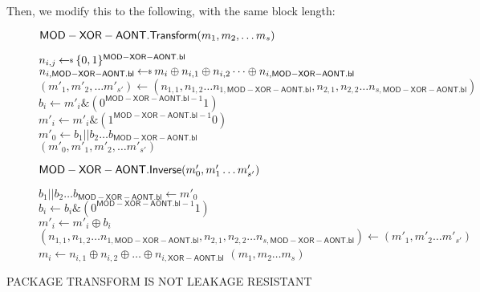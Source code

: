 \documentclass[11pt,twoside]{article}
\begin{document}
Then, we modify this to the following, with the same block length: 

\begin{figure}[h]
{
\underline{$\mathsf{MOD-XOR-AONT.Transform}(m_1,m_2,\dots m_s)$}

\begin{algorithm}[H]
{
{
$n_{i,j}\getsr\bits^{\mathsf{MOD-XOR-AONT.bl}}$
}
$n_{i,\mathsf{MOD-XOR-AONT.bl}}\getsr m_i \oplus n_{i,1} \oplus n_{i,2} \dots \oplus n_{i,\mathsf{MOD-XOR-AONT.bl}}$
}
$(m'_1,m'_2,\dots m'_{s'})  \gets (n_{1,1},n_{1,2}\dots n_{1,\mathsf{MOD-XOR-AONT.bl}},n_{2,1},n_{2,2}\dots n_{s,\mathsf{MOD-XOR-AONT.bl}})$\\
{
$b_i\gets m'_i \mathrel{\&} (0^{\mathsf{MOD-XOR-AONT.bl}-1}1)$\\
$m'_i\gets m'_i \mathrel{\&} (1^{\mathsf{MOD-XOR-AONT.bl}-1}0)$\\
}
$m'_0\gets b_1||b_2\dots b_\mathsf{MOD-XOR-AONT.bl}$\\
\Return $(m'_0,m'_1,m'_2,\dots m'_{s'})$
\end{algorithm}

\underline{$\mathsf{MOD-XOR-AONT.Inverse}(m'_0,m'_1\dots m'_{s'})$}

\begin{algorithm}[H]
$b_1||b_2\dots b_\mathsf{MOD-XOR-AONT.bl}\gets m'_0$\\
{
$b_i\gets b_i \mathrel{\&} (0^{\mathsf{MOD-XOR-AONT.bl}-1}1)$\\
$m'_i\gets m'_i \oplus b_i$\\
}
$(n_{1,1},n_{1,2}\dots n_{1,\mathsf{MOD-XOR-AONT.bl}},n_{2,1},n_{2,2}\dots n_{s,\mathsf{MOD-XOR-AONT.bl}})\gets (m'_1,m'_2\dots m'_{s'})$\\
{
$m_i\gets n_{i,1}\oplus n_{i,2}\oplus \dots \oplus n_{i,\mathsf{XOR-AONT.bl}}$
}
\Return $(m_1,m_2\dots m_s)$
\end{algorithm}
}
\end{figure} 


PACKAGE TRANSFORM IS NOT LEAKAGE RESISTANT
\end{document}
